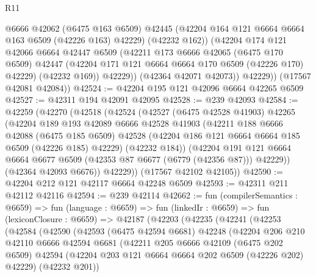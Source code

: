 \begin{lexlean}{R11}
\begin{coremodule}
                @6666
                @42062
                (@6475 @163 @6509)
                @42445
                (@42204 @164 @121 @6664 @6664 @163 @6509 (@42226 @163) @42229)
                (@42232 @162))
              (@42204
                @174
                @121
                @42066
                @6664
                @42447
                @6509
                (@42211
                  @173
                  @6666
                  @42065
                  (@6475 @170 @6509)
                  @42447
                  (@42204 @171 @121 @6664 @6664 @170 @6509 (@42226 @170) @42229)
                  (@42232 @169))
                @42229))
            (@42364 @42071 @42073))
          @42229))
      (@17567 @42081 @42084))
@42524 := @42204 @195 @121 @42096 @6664 @42265 @6509
@42527 := @42311 @194 @42091 @42095
@42528 := @239 @42093
@42584 := @42259
    (@42270
      (@42518
        (@42524
          (@42527
            (@6475 @42528 @41903)
            @42265
            (@42204
              @189
              @193
              @42089
              @6666
              @42528
              @41903
              (@42211
                @188
                @6666
                @42088
                (@6475 @185 @6509)
                @42528
                (@42204 @186 @121 @6664 @6664 @185 @6509 (@42226 @185) @42229)
                (@42232 @184))
              (@42204
                @191
                @121
                @6664
                @6664
                @6677
                @6509
                (@42353 @87 @6677 (@6779 (@42356 @87)))
                @42229))
            (@42364 @42093 @6676))
          @42229))
      (@17567 @42102 @42105))
@42590 := @42204 @212 @121 @42117 @6664 @42248 @6509
@42593 := @42311 @211 @42112 @42116
@42594 := @239 @42114
@42662 := fun (compilerSemantics : @6659) =>
  fun (language : @6659) =>
  fun (linkedIr : @6659) =>
  fun (lexiconClosure : @6659) =>
  @42187
    (@42203
      (@42235
        (@42241
          (@42253
            (@42584
              (@42590
                (@42593
                  (@6475 @42594 @6681)
                  @42248
                  (@42204
                    @206
                    @210
                    @42110
                    @6666
                    @42594
                    @6681
                    (@42211
                      @205
                      @6666
                      @42109
                      (@6475 @202 @6509)
                      @42594
                      (@42204 @203 @121 @6664 @6664 @202 @6509 (@42226 @202) @42229)
                      (@42232 @201))

\end{coremodule}
\end{lexlean}
